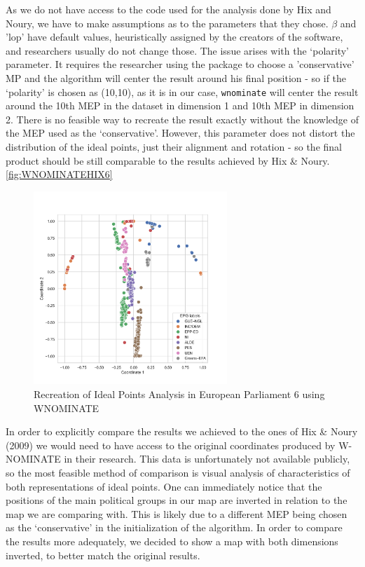 \documentclass[a4paper,12pt]{report}
\begin{document}
    As we do not have access to the code used for the analysis done by Hix and Noury, we have to make
    assumptions as
    to the parameters that they chose. \( \beta \)
    and 'lop' have default values, heuristically assigned by the
    creators of the software, and researchers usually do not change those. The issue arises with the
    `polarity'
    parameter. It requires the researcher using the package to choose a 'conservative' MP and the
    algorithm will
    center the result around his final position - so if the `polarity' is chosen as (10,10), as it
    is in our case, \texttt{wnominate}
    will center the result around the 10th MEP in the dataset in dimension 1 and 10th MEP in dimension 2.
    There is
    no feasible way to recreate the result exactly without the knowledge of the MEP used as the
    `conservative'.
    However, this parameter does not distort the distribution of the ideal points, just their alignment and
    rotation
    - so the final product should be still comparable to the results achieved by Hix \& Noury.
    \ref{fig:WNOMINATEHIX6}

    \begin{figure}[H]
        \centering
        \includegraphics[width=0.65\textwidth]{Graphs/WNOMINATE2d}
        \caption{Recreation of Ideal Points Analysis in European Parliament 6 using WNOMINATE}
        \label{fig:WNOMINATE 6}
    \end{figure}



    In order to explicitly compare the results we achieved to the ones of Hix \& Noury (2009) we would need
    to have
    access to the original coordinates produced by W-NOMINATE in their research. This data is
    unfortunately not available publicly, so the most feasible method of comparison is visual analysis
    of characteristics of both representations of ideal points. One can immediately notice that the
    positions of the main political groups in our map are inverted in relation to the map we are
    comparing with. This is likely due to a different MEP being chosen as the `conservative' in the
    initialization of the algorithm. In order to compare the results more adequately, we decided to show
    a map with both dimensions inverted, to better match the original results.
\end{document}
